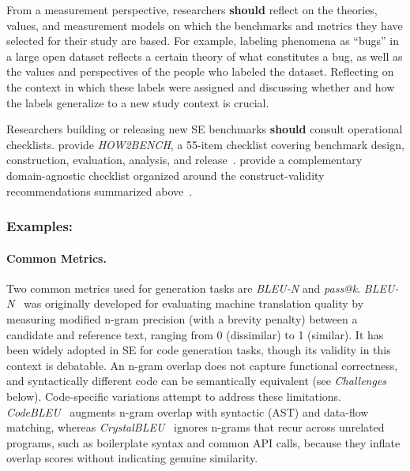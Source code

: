 \documentclass[smallextended]{svjour3}
\newcommand{\should}{\textbf{should}\xspace}
\newcommand{\guidelinesubsubsection}[1]{\subsubsection{\bfseries #1:}}
\newcommand{\guidelineparagraph}[1]{\paragraph{#1.}}
\newcommand{\guidelinesubsubsection}[1]{\subsubsection{#1}}
\newcommand{\guidelineparagraph}[1]{\paragraph{#1}}
\begin{document}
From a measurement perspective, researchers \should reflect on the theories, values, and measurement models on which the benchmarks and metrics they have selected for their study are based.
For example, labeling phenomena as ``bugs'' in a large open dataset reflects a certain theory of what constitutes a bug, as well as the values and perspectives of the people who labeled the dataset. Reflecting on the context in which these labels were assigned and discussing whether and how the labels generalize to a new study context is crucial.

Researchers building or releasing new SE benchmarks \should consult operational checklists. \citeauthor{cao2025should} provide \emph{HOW2BENCH}, a 55-item checklist covering benchmark design, construction, evaluation, analysis, and release~\cite{cao2025should}. \citeauthor{bean2025measuring} provide a complementary domain-agnostic checklist organized around the construct-validity recommendations summarized above~\cite{bean2025measuring}.

\guidelinesubsubsection{Examples}

\guidelineparagraph{Common Metrics}

Two common metrics used for generation tasks are \emph{BLEU-N} and \emph{pass@k}.
\emph{BLEU-N}~\cite{DBLP:conf/acl/PapineniRWZ02} was originally developed for evaluating machine translation quality by measuring modified n-gram precision (with a brevity penalty) between a candidate and reference text, ranging from 0 (dissimilar) to 1 (similar). It has been widely adopted in SE for code generation tasks, though its validity in this context is debatable. An n-gram overlap does not capture functional correctness, and syntactically different code can be semantically equivalent (see \emph{Challenges} below).
Code-specific variations attempt to address these limitations. \emph{CodeBLEU}~\cite{DBLP:journals/corr/abs-2009-10297} augments n-gram overlap with syntactic (AST) and data-flow matching, whereas \emph{CrystalBLEU}~\cite{DBLP:conf/kbse/EghbaliP22} ignores n-grams that recur across unrelated programs, such as boilerplate syntax and common API calls, because they inflate overlap scores without indicating genuine similarity.
\end{document}
